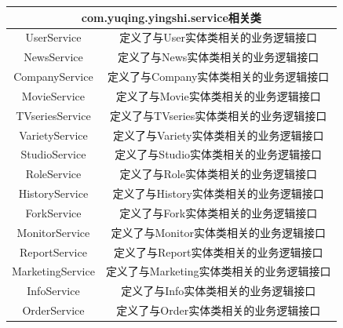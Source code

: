 \begin{tabular}{|c|c|} 
\hline 
\multicolumn{2}{|c|}{com.yuqing.yingshi.service相关类} \\ 
\hline 
UserService&定义了与User实体类相关的业务逻辑接口\\
NewsService&定义了与News实体类相关的业务逻辑接口\\
CompanyService&定义了与Company实体类相关的业务逻辑接口\\
MovieService&定义了与Movie实体类相关的业务逻辑接口\\
TVseriesService&定义了与TVseries实体类相关的业务逻辑接口\\
VarietyService&定义了与Variety实体类相关的业务逻辑接口\\
StudioService&定义了与Studio实体类相关的业务逻辑接口\\
RoleService&定义了与Role实体类相关的业务逻辑接口\\
HistoryService&定义了与History实体类相关的业务逻辑接口\\
ForkService&定义了与Fork实体类相关的业务逻辑接口\\
MonitorService&定义了与Monitor实体类相关的业务逻辑接口\\
ReportService&定义了与Report实体类相关的业务逻辑接口\\
MarketingService&定义了与Marketing实体类相关的业务逻辑接口\\
InfoService&定义了与Info实体类相关的业务逻辑接口\\
OrderService&定义了与Order实体类相关的业务逻辑接口\\
\hline 
\end{tabular}

